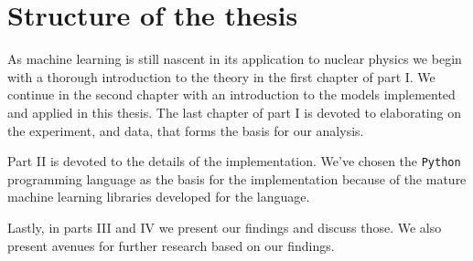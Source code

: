 \section{Structure of the thesis}

As machine learning is still nascent in its application to nuclear physics we begin with a thorough introduction to the theory in the first chapter of part I. We continue in the second chapter with an introduction to the models implemented and applied in this thesis. The last chapter of part I is devoted to elaborating on the experiment, and data, that forms the basis for our analysis.

Part II is devoted to the details of the implementation. We've chosen the \lstinline{Python} programming language as the basis for the implementation because of the mature machine learning libraries developed for the language. 

Lastly, in parts III and IV we present our findings and discuss those. We also present avenues for further research based on our findings.
